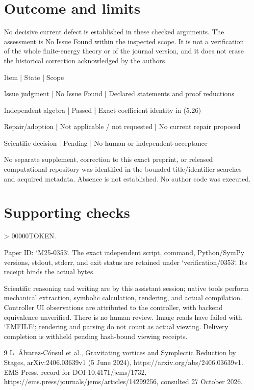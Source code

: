 \documentclass[10pt]{article}
\begin{document}
\section*{Outcome and limits}
No decisive current defect is established in these checked arguments. The assessment is No Issue Found within the inspected scope. It is not a verification of the whole finite-energy theory or of the journal version, and it does not erase the historical correction acknowledged by the authors.\par
Item | State | Scope\par
Issue judgment | No Issue Found | Declared statements and proof reductions\par
Independent algebra | Passed | Exact coefficient identity in (5.26)\par
Repair/adoption | Not applicable / not requested | No current repair proposed\par
Scientific decision | Pending | No human or independent acceptance\par
No separate supplement, correction to this exact preprint, or released computational repository was identified in the bounded title/identifier searches and acquired metadata. Absence is not established. No author code was executed.\par
\section*{Supporting checks}
> 00000TOKEN.\par
Paper ID: `M25-0353`. The exact independent script, command, Python/SymPy versions, stdout, stderr, and exit status are retained under `verification/0353`. Its receipt binds the actual bytes.\par
Scientific reasoning and writing are by this assistant session; native tools perform mechanical extraction, symbolic calculation, rendering, and actual compilation. Controller UI observations are attributed to the controller, with backend equivalence unverified. There is no human review. Image reads have failed with `EMFILE`; rendering and parsing do not count as actual viewing. Delivery completion is withheld pending hash-bound viewing receipts.\par
9 L. Álvarez-Cónsul et al., Gravitating vortices and Symplectic Reduction by Stages, arXiv:2406.03639v1 (5 June 2024), https://arxiv.org/abs/2406.03639v1. EMS Press, record for DOI 10.4171/jems/1732, https://ems.press/journals/jems/articles/14299256, consulted 27 October 2026.\par
\end{document}
